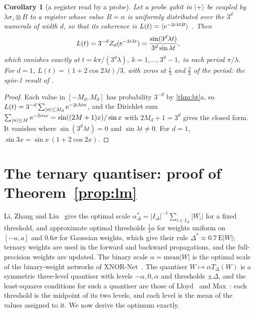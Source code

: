 \documentclass[11pt]{article}
\newtheorem{corollary}[theorem]{Corollary}
\theoremstyle{definition}\newtheorem{definition}[theorem]{Definition}
\theoremstyle{remark}\newtheorem{remark}[theorem]{Remark}
\begin{document}
\begin{corollary}[a register read by a probe]\label{cor:probe}
Let a probe qubit in $|{+}\rangle$ be coupled by $\lambda\sigma_z\otimes B$ to a register whose value $B=n$ is uniformly distributed over the $3^d$ numerals of width $d$, so that its coherence is $L(t)=\langle\mathrm e^{-2i\lambda tB}\rangle$ \cite{SQuant}. Then
\[
L(t)=3^{-d}Z_d(\mathrm e^{-2i\lambda t})=\frac{\sin(3^d\lambda t)}{3^d\sin\lambda t},
\]
which vanishes exactly at $t=k\pi/(3^d\lambda)$, $k=1,\dots,3^d-1$, in each period $\pi/\lambda$. For $d=1$, $L(t)=(1+2\cos2\lambda t)/3$, with zeros at $\frac13$ and $\frac23$ of the period: the spin-1 result of \cite{SQuant}.
\end{corollary}
\begin{proof}
Each value in $[-M_d,M_d]$ has probability $3^{-d}$ by \cref{thm:bt}a, so $L(t)=3^{-d}\sum_{|n|\le M_d}\mathrm e^{-2i\lambda tn}$, and the Dirichlet sum $\sum_{|n|\le M}\mathrm e^{-2inx}=\sin((2M+1)x)/\sin x$ with $2M_d+1=3^d$ gives the closed form. It vanishes where $\sin(3^d\lambda t)=0$ and $\sin\lambda t\ne0$. For $d=1$, $\sin3x=\sin x\,(1+2\cos2x)$.
\end{proof}

\section{The ternary quantiser: proof of \texorpdfstring{Theorem~\ref{prop:lm}}{Theorem 1.4}}\label{sec:quant}
Li, Zhang and Liu~\cite{twn2016} give the optimal scale $\alpha^*_\Delta=|I_\Delta|^{-1}\sum_{i\in I_\Delta}|W_i|$ for a fixed threshold, and approximate optimal thresholds $\frac13a$ for weights uniform on $[-a,a]$ and $0.6\sigma$ for Gaussian weights, which give their rule $\Delta^*\approx0.7\,\mathrm E|W|$; ternary weights are used in the forward and backward propagations, and the full-precision weights are updated. The binary scale $\alpha=\mathrm{mean}|W|$ is the optimal scale of the binary-weight networks of XNOR-Net~\cite{xnor2016}. The quantiser $W\mapsto\alpha T_\Delta(W)$ is a symmetric three-level quantiser with levels $-\alpha,0,\alpha$ and thresholds $\pm\Delta$, and the least-squares conditions for such a quantiser are those of Lloyd~\cite{lloyd1982} and Max~\cite{max1960}: each threshold is the midpoint of its two levels, and each level is the mean of the values assigned to it. We now derive the optimum exactly.
\end{document}
